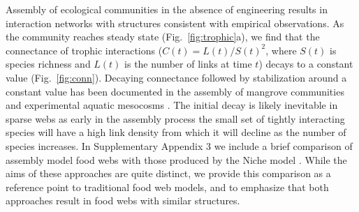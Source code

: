 \documentclass[twocolumn,preprintnumbers,amsmath,amssymb,superscriptaddress,linenumbers]{revtex4-1}
\newcommand{\rr}[1]{{\rm #1}}
\begin{document}
Assembly of ecological communities in the absence of engineering results in interaction networks with structures consistent with empirical observations.
As the community reaches steady state (Fig.\ \ref{fig:trophic}a), we find that the connectance of trophic interactions ($C(t)=L(t)/S(t)^2$, where $S(t)$ is species richness and $L(t)$ is the number of links at time $t$) decays to a constant value (Fig.\ \ref{fig:conn}). %
Decaying connectance followed by stabilization around a constant value has been documented in the assembly of mangrove communities \cite{Piechnik2008} and experimental aquatic mesocosms \cite{Fahimipour2014}. 
The initial decay is likely inevitable in sparse webs as early in the assembly process the small set of tightly interacting species will have a high link density from which it will decline as the number of species increases.
In Supplementary Appendix 3 we include a brief comparison of assembly model food webs with those produced by the Niche model \cite{Williams2000}.
While the aims of these approaches are quite distinct, we provide this comparison as a reference point to traditional food web models, and to emphasize that both approaches result in food webs with similar structures.

% 
\end{document}

